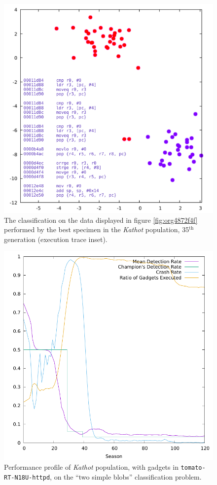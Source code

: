 \documentclass[12pt,glossary]{dalthesis}
\begin{document}
\begin{figure}[htbp]
\centering
\includegraphics[width=.9\linewidth]{../images/plots/kathot_champion_18916_blobs_disas.pdf}
\caption{\label{fig:org13d36b2}
The classification on the data displayed in figure \ref{fig:org4872f4f} performed by the best specimen in the \emph{Kathot} population, 35\(^{\text{th}}\) generation (execution trace inset).}
\end{figure}

\begin{figure}[htbp]
\centering
\includegraphics[width=.9\linewidth]{../images/plots/kathot_fitness.pdf}
\caption{\label{fig:org9b790a8}
Performance profile of \emph{Kathot} population, with gadgets in \texttt{tomato-RT-N18U-httpd}, on the ``two simple blobs'' classification problem.}
\end{figure}
\end{document}
